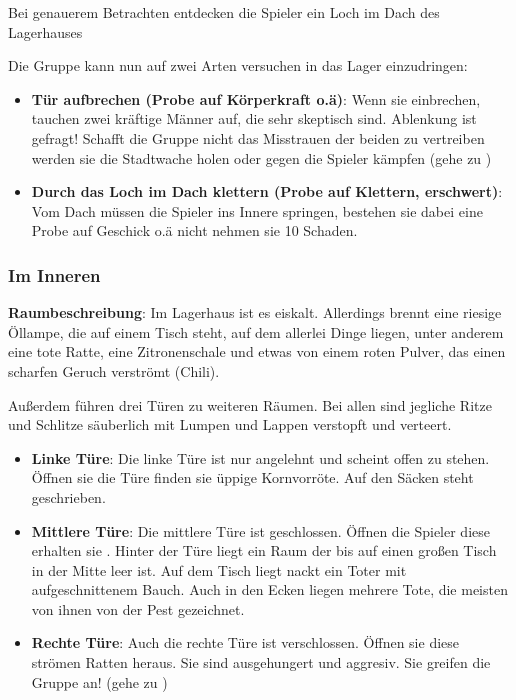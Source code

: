 Bei genauerem Betrachten entdecken die Spieler ein Loch im Dach des Lagerhauses


Die Gruppe kann nun auf zwei Arten versuchen in das Lager einzudringen:

\begin{itemize}
  \item \textbf{Tür aufbrechen (Probe auf Körperkraft o.ä)}: Wenn sie einbrechen, tauchen zwei kräftige Männer auf, die sehr skeptisch sind. Ablenkung ist gefragt! Schafft die Gruppe nicht das Misstrauen der beiden zu vertreiben werden sie die Stadtwache holen oder gegen die Spieler kämpfen (gehe zu \blue{\ref{kampf2}})
  \item \textbf{Durch das Loch im Dach klettern (Probe auf Klettern, erschwert)}: Vom Dach müssen die Spieler ins Innere springen, bestehen sie dabei eine Probe auf Geschick o.ä nicht nehmen sie 10 Schaden.
\end{itemize}

\subsubsection{Im Inneren}

\textbf{Raumbeschreibung}: Im Lagerhaus ist es eiskalt. Allerdings brennt eine riesige Öllampe, die auf einem Tisch steht, auf dem allerlei Dinge liegen, unter anderem eine tote Ratte, eine Zitronenschale und etwas von einem roten Pulver, das einen scharfen Geruch verströmt (Chili).

Außerdem führen drei Türen zu weiteren Räumen. Bei allen sind jegliche Ritze und Schlitze säuberlich mit Lumpen und Lappen verstopft und verteert.

\begin{itemize}
  \item \textbf{Linke Türe}: Die linke Türe ist nur angelehnt und scheint offen zu stehen. Öffnen sie die Türe finden sie üppige Kornvorröte. Auf den Säcken steht  geschrieben.
  \item \textbf{Mittlere Türe}: Die mittlere Türe ist geschlossen. Öffnen die Spieler diese erhalten sie . Hinter der Türe liegt ein Raum der bis auf einen großen Tisch in der Mitte leer ist. Auf dem Tisch liegt nackt ein Toter mit aufgeschnittenem Bauch. Auch in den Ecken liegen mehrere Tote, die meisten von ihnen von der Pest gezeichnet.
  \item \textbf{Rechte Türe}: Auch die rechte Türe ist verschlossen. Öffnen sie diese strömen Ratten heraus. Sie sind ausgehungert und aggresiv. Sie greifen die Gruppe an! (gehe zu \blue{\ref{kampf3}})
\end{itemize}


